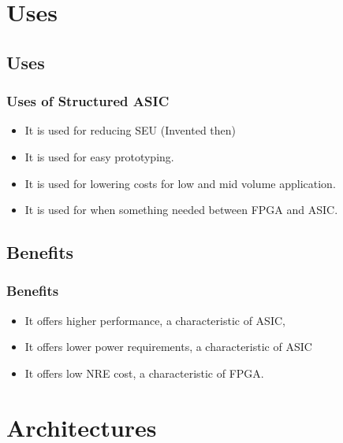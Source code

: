 \documentclass{beamer}
\begin{document}
\section{Uses}
\subsection{Uses}
\frame
{
  \frametitle{Uses of Structured ASIC}
  \begin{itemize}
  \item It is used for reducing SEU (Invented then)
  \item It is used for easy prototyping.
  \item It is used for lowering costs for low and mid volume application. 
  \item It is used for when something needed between FPGA and ASIC.
  \end{itemize}
}

\subsection{Benefits}
\frame
{
  \frametitle{Benefits}
  \begin{itemize}
  \item It offers higher performance, a characteristic of ASIC,
  \item It offers lower power requirements, a characteristic of ASIC 
  \item It offers low NRE cost, a characteristic of FPGA. 
  \end{itemize}
}

\section{Architectures}
\end{document}
